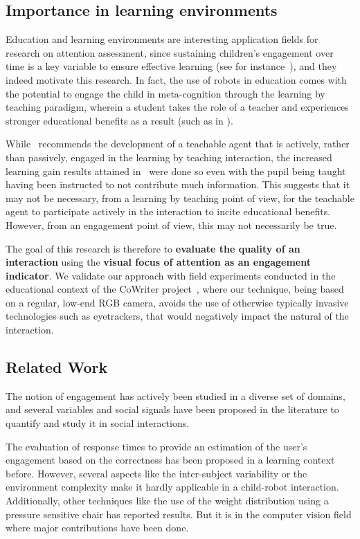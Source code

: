 \documentclass{sig-alternate}
\begin{document}
\subsection{Importance in learning environments}

Education and learning environments are interesting application fields for
research on attention assessment, since sustaining children's engagement over
time is a key variable to ensure effective learning (see for
instance~\cite{Umbach}), and they indeed motivate this research. In fact, the
use of robots in education comes with the potential to engage the child in
meta-cognition through the learning by teaching paradigm, wherein a student
takes the role of a teacher and experiences stronger educational benefits as a
result (such as in \cite{Palinscar1984}).

While~\cite{zhao2012learning} recommends the development of a teachable agent
that is actively, rather than passively, engaged in the learning by teaching
interaction, the increased learning gain results attained
in~\cite{okita2006observation} were done so even with the pupil being taught
having been instructed to not contribute much information. This suggests that it
may not be necessary, from a learning by teaching point of view, for the
teachable agent to participate actively in the interaction to incite educational
benefits. However, from an engagement point of view, this may not necessarily be
true.

The goal of this research is therefore to \textbf{evaluate the quality of an
interaction} using the \textbf{visual focus of attention as an engagement
indicator}. We validate our approach with field experiments conducted in the
educational context of the CoWriter project~\cite{Hood:2015}, where our
technique, being based on a regular, low-end RGB camera, avoids the use of
otherwise typically invasive technologies such as eyetrackers, that would
negatively impact the natural of the interaction.

\subsection{Related Work}

The notion of engagement has actively been studied in a diverse set of domains,
and several variables and social signals have been proposed in the literature to
quantify and study it in social interactions.

The evaluation of response times to provide an estimation of the user's
engagement based on the correctness has been proposed in a learning context
\cite{Beck} before. However, several aspects like the inter-subject variability
or the environment complexity make it hardly applicable in a child-robot
interaction. Additionally, other techniques \cite{Chipman07postureas} like the
use of the weight distribution using a pressure sensitive chair has reported
results. But it is in the computer vision field where major contributions have
been done. 
\end{document}
